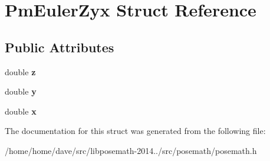 \hypertarget{structPmEulerZyx}{}\section{Pm\+Euler\+Zyx Struct Reference}
\label{structPmEulerZyx}
\subsection*{Public Attributes}
\begin{DoxyCompactItemize}
\item 
\hypertarget{structPmEulerZyx_ad631af580a7537ca9bb6cf49cf0a678d}{}double {\bfseries z}\label{structPmEulerZyx_ad631af580a7537ca9bb6cf49cf0a678d}

\item 
\hypertarget{structPmEulerZyx_af5fa3ee219a2a0fa530aa052ea419127}{}double {\bfseries y}\label{structPmEulerZyx_af5fa3ee219a2a0fa530aa052ea419127}

\item 
\hypertarget{structPmEulerZyx_a05f63fddcbebd46ff61343ad5741fa35}{}double {\bfseries x}\label{structPmEulerZyx_a05f63fddcbebd46ff61343ad5741fa35}

\end{DoxyCompactItemize}


The documentation for this struct was generated from the following file\+:\begin{DoxyCompactItemize}
\item 
/home/home/dave/src/libposemath-\/2014../src/posemath/posemath.\+h\end{DoxyCompactItemize}
